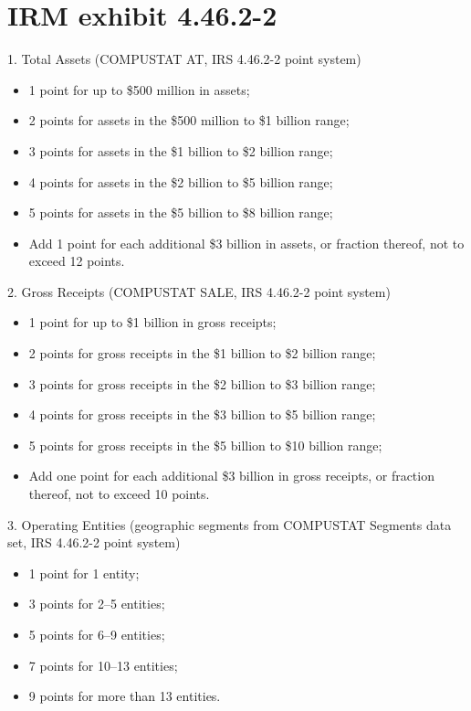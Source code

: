 \documentclass[12pt]{article}
\begin{document}
\appendix
\section{IRM exhibit 4.46.2-2}
\label{app:IRM}
\centering

\vspace{\baselineskip}
1. Total Assets (COMPUSTAT AT, IRS 4.46.2-2 point system)
\begin{itemize}
   \item 1 point for up to \$500 million in assets;
   \item 2 points for assets in the \$500 million to \$1 billion range;
   \item 3 points for assets in the \$1 billion to \$2 billion range;
   \item 4 points for assets in the \$2 billion to \$5 billion range;
   \item 5 points for assets in the \$5 billion to \$8 billion range;
   \item Add 1 point for each additional \$3 billion in assets, or fraction thereof, not to exceed 12 points.
\end{itemize}
\vspace{\baselineskip}

2. Gross Receipts (COMPUSTAT SALE, IRS 4.46.2-2 point system)
\begin{itemize}
   \item 1 point for up to \$1 billion in gross receipts;
   \item 2 points for gross receipts in the \$1 billion to \$2 billion range;
   \item 3 points for gross receipts in the \$2 billion to \$3 billion range;
   \item 4 points for gross receipts in the \$3 billion to \$5 billion range;
   \item 5 points for gross receipts in the \$5 billion to \$10 billion range;
   \item Add one point for each additional \$3 billion in gross receipts, or fraction thereof, not to exceed 10 points.
\end{itemize}
\vspace{\baselineskip}

3. Operating Entities (geographic segments from COMPUSTAT Segments data set, IRS 4.46.2-2 point system)
\begin{itemize}
   \item 1 point for 1 entity;
   \item 3 points for 2--5 entities;
   \item 5 points for 6--9 entities;
   \item 7 points for 10--13 entities;
   \item 9 points for more than 13 entities.
\end{itemize}
\vspace{\baselineskip}
\end{document}

